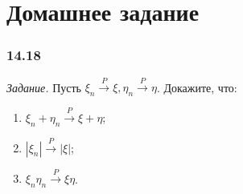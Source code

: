 \section*{Домашнее задание}

\subsubsection*{14.18}

\textit{Задание.} Пусть $ \xi_n \overset{P}{ \rightarrow } \xi, \eta_n \overset{P}{ \rightarrow } \eta$.
Докажите, что:
\begin{enumerate}[label=\alph*)]
\item $ \xi_n + \eta_n \overset{P}{ \rightarrow } \xi + \eta$;
\item $ \left| \xi_n \right| \overset{P}{ \rightarrow } \left| \xi \right| $;
\item $ \xi_n \eta_n \overset{P}{ \rightarrow } \xi \eta $.
\end{enumerate}

